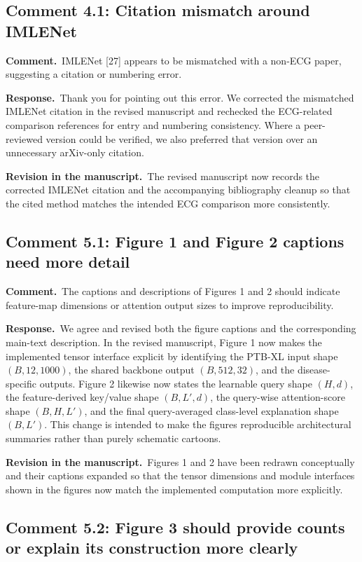 \documentclass[11pt]{article}
\newcommand{\commentheader}{\textbf{Comment.}}
\newcommand{\responseheader}{\textbf{Response.}}
\newcommand{\revisionheader}{\textbf{Revision in the manuscript.}}
\begin{document}
\subsection*{Comment 4.1: Citation mismatch around IMLENet}

\commentheader\ IMLENet [27] appears to be mismatched with a non-ECG paper, suggesting a citation or numbering error.

\responseheader\ Thank you for pointing out this error. We corrected the mismatched IMLENet citation in the revised manuscript and rechecked the ECG-related comparison references for entry and numbering consistency. Where a peer-reviewed version could be verified, we also preferred that version over an unnecessary arXiv-only citation.

\revisionheader\ The revised manuscript now records the corrected IMLENet citation and the accompanying bibliography cleanup so that the cited method matches the intended ECG comparison more consistently.

\subsection*{Comment 5.1: Figure 1 and Figure 2 captions need more detail}

\commentheader\ The captions and descriptions of Figures 1 and 2 should indicate feature-map dimensions or attention output sizes to improve reproducibility.

\responseheader\ We agree and revised both the figure captions and the corresponding main-text description. In the revised manuscript, Figure 1 now makes the implemented tensor interface explicit by identifying the PTB-XL input shape $(B,12,1000)$, the shared backbone output $(B,512,32)$, and the disease-specific outputs. Figure 2 likewise now states the learnable query shape $(H,d)$, the feature-derived key/value shape $(B,L',d)$, the query-wise attention-score shape $(B,H,L')$, and the final query-averaged class-level explanation shape $(B,L')$. This change is intended to make the figures reproducible architectural summaries rather than purely schematic cartoons.

\revisionheader\ Figures 1 and 2 have been redrawn conceptually and their captions expanded so that the tensor dimensions and module interfaces shown in the figures now match the implemented computation more explicitly.

\subsection*{Comment 5.2: Figure 3 should provide counts or explain its construction more clearly}
\end{document}
